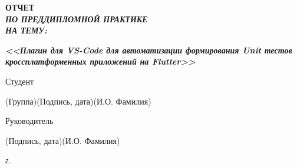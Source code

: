 \documentclass[14pt, russian]{scrartcl}
\begin{document}
\begin{titlepage}
 
\vspace{3em}
 
\begin{center}
\Large \bf{ОТЧЕТ\\\textbf{\textit{ПО ПРЕДДИПЛОМНОЙ ПРАКТИКЕ\\НА ТЕМУ:}} \\}
\end{center}

\vspace*{-6ex} 
\begin{center}
\Large{\textit{\textbf{<<Плагин для VS-Code для автоматизации формирования Unit тестов кроссплатформенных приложений на Flutter>>}}}
\end{center}
 
\vspace{\fill}
 

\newlength{\ML}

\noindent Студент \underline{\hspace{1.5cm}} \hfill \underline{\hspace{4cm}}\quad
\underline{\hspace{4cm}}

\vspace{-2.1ex}
\noindent\hspace{9ex}\scriptsize{(Группа)}\normalsize\hspace{170pt}\hspace{2ex}\scriptsize{(Подпись, дата)}\normalsize\hspace{30pt}\hspace{6ex}\scriptsize{(И.О. Фамилия)}\normalsize

\bigskip

\noindent Руководитель  \hfill \underline{\hspace{4cm}}\quad
\underline{\hspace{4cm}}

\vspace{-2ex}
\noindent\hspace{13.5ex}\normalsize\hspace{170pt}\hspace{2ex}\scriptsize{(Подпись, дата)}\normalsize\hspace{30pt}\hspace{6ex}\scriptsize{(И.О. Фамилия)}\normalsize
\vfill

 


\begin{center}
\textsl{\the\year{} г.}
\end{center}
\end{titlepage}
\end{document}
